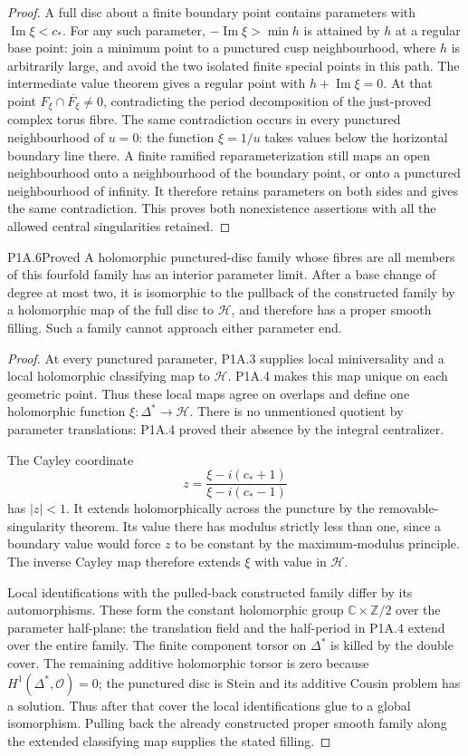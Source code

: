 \begin{proof}
A full disc about a finite boundary point contains parameters
with $\operatorname{Im}\xi<c_*$. For any such parameter,
$-\operatorname{Im}\xi>\min h$ is attained by $h$ at a
regular base point: join a minimum point to a punctured
cusp neighbourhood, where $h$ is arbitrarily large, and
avoid the two isolated finite special points in this path.
The intermediate value theorem gives a regular point with
$h+\operatorname{Im}\xi=0$. At that point
$F_\xi\cap\overline{F_\xi}\ne0$, contradicting the period
decomposition of the just-proved complex torus fibre.
The same contradiction occurs in every punctured
neighbourhood of $u=0$: the function $\xi=1/u$ takes
values below the horizontal boundary line there. A finite
ramified reparameterization still maps an open neighbourhood
onto a neighbourhood of the boundary point, or onto a
punctured neighbourhood of infinity. It therefore retains
parameters on both sides and gives the same contradiction.
This proves both nonexistence assertions with all the
allowed central singularities retained.
\end{proof}

\begin{statement}{P1A.6}{Proved}
A holomorphic punctured-disc family whose fibres are all
members of this fourfold family has an interior parameter
limit. After a base change of degree at most two, it is
isomorphic to the pullback of the constructed family by
a holomorphic map of the full disc to $\mathcal H$, and
therefore has a proper smooth filling. Such a family
cannot approach either parameter end.
\end{statement}
\begin{proof}
At every punctured parameter, P1A.3 supplies local
miniversality and a local holomorphic classifying map to
$\mathcal H$. P1A.4 makes this map unique on each geometric
point. Thus these local maps agree on overlaps and define
one holomorphic function $\xi:\Delta^*\to\mathcal H$.
There is no unmentioned quotient by parameter translations:
P1A.4 proved their absence by the integral centralizer.

The Cayley coordinate
\[
 z=\frac{\xi-i(c_*+1)}{\xi-i(c_*-1)}
\]
has $|z|<1$. It extends holomorphically across the puncture
by the removable-singularity theorem. Its value there has
modulus strictly less than one, since a boundary value
would force $z$ to be constant by the maximum-modulus
principle. The inverse Cayley map therefore extends
$\xi$ with value in $\mathcal H$.

Local identifications with the pulled-back constructed
family differ by its automorphisms. These form the constant
holomorphic group $\mathbb C\times\mathbb Z/2$ over the
parameter half-plane: the translation field and the
half-period in P1A.4 extend over the entire family.
The finite component torsor on $\Delta^*$ is killed by
the double cover. The remaining additive holomorphic
torsor is zero because $H^1(\Delta^*,\mathcal O)=0$;
the punctured disc is Stein and its additive Cousin
problem has a solution. Thus after that cover the local
identifications glue to a global isomorphism. Pulling
back the already constructed proper smooth family along
the extended classifying map supplies the stated filling.
\end{proof}
